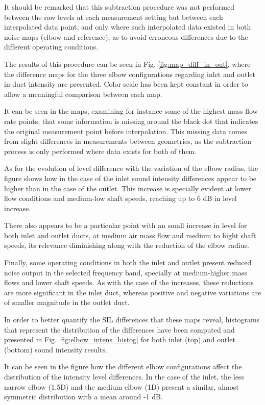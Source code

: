 It should be remarked that this subtraction procedure was not performed between the raw levels at each measurement setting but between each interpolated data point, and only where such interpolated data existed in both noise maps (elbow and reference), as to avoid erroneous differences due to the different operating conditions. 

The results of this procedure can be seen in Fig. \ref{fig:map_diff_in_out}, where the difference maps for the three elbow configurations regarding inlet and outlet in-duct intensity are presented. Color scale has been kept constant in order to allow a meaningful comparison between each map.

It can be seen in the maps, examining for instance some of the highest mass flow rate points, that some information is missing around the black dot that indicates the original measurement point before interpolation. This missing data comes from slight differences in measurements between geometries, as the subtraction process is only performed where data exists for both of them.

As for the evolution of level difference with the variation of the elbow radius, the figure shows how in the case of the inlet sound intensity differences appear to be higher than in the case of the outlet. This increase is specially evident at lower flow conditions and medium-low shaft speeds, reaching up to 6 dB in level increase. 

There also appears to be a particular point with an small increase in level for both inlet and outlet ducts, at medium air mass flow and medium to hight shaft speeds, its relevance diminishing along with the reduction of the elbow radius.

Finally, some operating conditions in both the inlet and outlet present reduced noise output in the selected frequency band, specially at medium-higher mass flows and lower shaft speeds. As with the case of the increases, these reductions are more significant in the inlet duct, whereas positive and negative variations are of smaller magnitude in the outlet duct.

In order to better quantify the SIL differences that these maps reveal, histograms that represent the distribution of the differences have been computed and presented in Fig. \ref{fig:elbow_intens_histog} for both inlet (top) and outlet (bottom) sound intensity results.

It can be seen in the figure how the different elbow configurations affect the distribution of the intensity level differences. In the case of the inlet, the less narrow elbow (1.5D) and the medium elbow (1D) present a similar, almost symmetric distribution with a mean around -1 dB.

